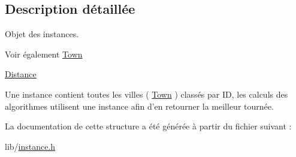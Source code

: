 \subsection{Description détaillée}
Objet des instances. \begin{DoxySeeAlso}{Voir également}
\hyperlink{structTown}{Town} 

\hyperlink{structDistance}{Distance}
\end{DoxySeeAlso}
Une instance contient toutes les villes ( \hyperlink{structTown}{Town} ) classés par ID, les calculs des algorithmes utilisent une instance afin d'en retourner la meilleur tournée. 

La documentation de cette structure a été générée à partir du fichier suivant :\begin{DoxyCompactItemize}
\item 
lib/\hyperlink{instance_8h}{instance.h}\end{DoxyCompactItemize}
